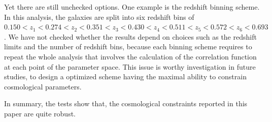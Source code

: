\documentclass[iop]{emulateapj}
\begin{document}

Yet there are still unchecked options. 
One example is the redshift binning scheme.
In this analysis, the galaxies are split into six redshift bins of
$0.150<z_1<0.274<z_2<0.351<z_3<0.430<z_4<0.511<z_5<0.572<z_6<0.693$.
We have not checked whether the results depend on choices such as the redshift limits and the number of redshift bins,
because each binning scheme requires to repeat the whole analysis that involves the calculation of the correlation function 
at each point of the parameter space.
This issue is worthy investigation in future studies, 
to design a optimized scheme having the maximal ability to constrain cosmological parameters.

In summary, the tests show that, the cosmological constraints reported in this paper are quite robust.


\

\

\
\end{document}
